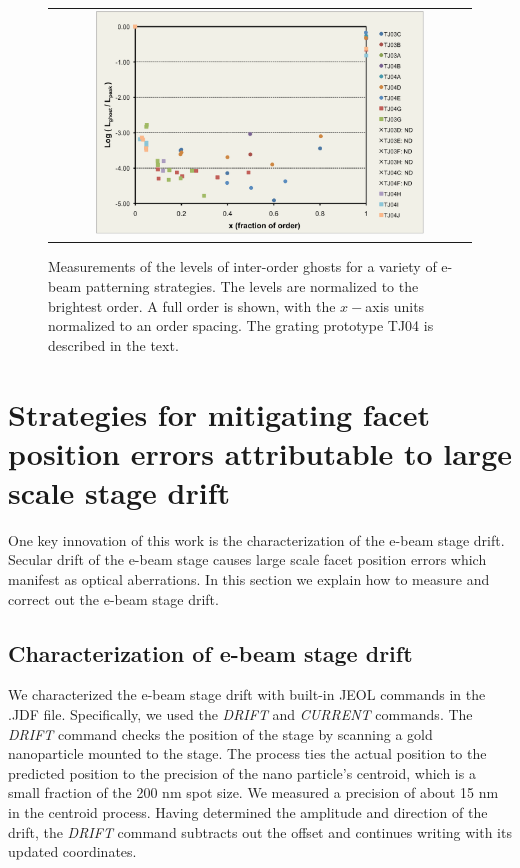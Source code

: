 \documentclass[]{spie}  %
\begin{document}
\begin{figure}
\begin{center}
 \begin{tabular}{c}
    \includegraphics[width=0.8\textwidth]{figs/TJ04_ghosts_pretty_alt.pdf}
   \end{tabular}
  \end{center}
  \caption[Ghost level measurements]{\label{fig:GhostLevelFig} Measurements of the levels of inter-order ghosts for a variety of e-beam patterning strategies.  The levels are normalized to the brightest order.  A full order is shown, with the $x-$axis units normalized to an order spacing.  The grating prototype TJ04 is described in the text.}
\end{figure}


\section{Strategies for mitigating facet position errors attributable to large scale stage drift}

One key innovation of this work is the characterization of the e-beam stage drift.  Secular drift of the e-beam stage causes large scale facet position errors which manifest as optical aberrations.  In this section we explain how to measure and correct out the e-beam stage drift.

\subsection{Characterization of e-beam stage drift}
We characterized the e-beam stage drift with built-in JEOL commands in the .JDF file.  Specifically, we used the \emph{DRIFT} and \emph{CURRENT} commands.  The \emph{DRIFT} command checks the position of the stage by scanning a gold nanoparticle mounted to the stage.  The process ties the actual position to the predicted position to the precision of the nano particle's centroid, which is a small fraction of the 200 nm spot size.  We measured a precision of about 15 nm in the centroid process.  Having determined the amplitude and direction of the drift, the \emph{DRIFT} command subtracts out the offset and continues writing with its updated coordinates.
\end{document}
